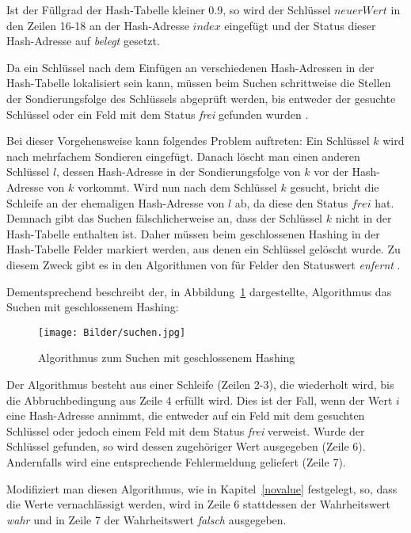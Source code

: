 Ist der Füllgrad der Hash-Tabelle kleiner \(0.9\), so wird der Schlüssel \(neuerWert\) in den Zeilen 16-18 an der Hash-Adresse \(index\) eingefügt und der Status dieser Hash-Adresse auf \textit{belegt} gesetzt.

Da ein Schlüssel nach dem Einfügen an verschiedenen Hash-Adressen in der Hash-Tabelle lokalisiert sein kann, müssen beim Suchen schrittweise die Stellen der Sondierungsfolge des Schlüssels abgeprüft werden, bis entweder der gesuchte Schlüssel oder ein Feld mit dem Status \textit{frei} gefunden wurden \cite[S.~204]{ADSOttWid}. 

Bei dieser Vorgehensweise kann folgendes Problem auftreten: Ein Schlüssel \(k\) wird nach mehrfachem Sondieren eingefügt. Danach löscht man einen anderen Schlüssel \(l\), dessen Hash-Adresse in der Sondierungsfolge von \(k\) vor der Hash-Adresse von \(k\) vorkommt. Wird nun nach dem Schlüssel \(k\) gesucht, bricht die Schleife an der ehemaligen Hash-Adresse von \(l\) ab, da diese den Status \(frei\) hat. Demnach gibt das Suchen fälschlicherweise an, dass der Schlüssel \(k\) nicht in der Hash-Tabelle enthalten ist. Daher müssen beim geschlossenen Hashing in der Hash-Tabelle Felder markiert werden, aus denen ein Schlüssel gelöscht wurde. Zu diesem Zweck gibt es in den Algorithmen von \cite{ADSWeiWei} für Felder den Statuswert \textit{enfernt} \cite[S.~242]{ADSWeiWei}. 

Dementsprechend beschreibt der, in Abbildung~\ref{ht_suchen} dargestellte, Algorithmus das Suchen mit geschlossenem Hashing:
\begin{figure}[H]
	\centering
	\texttt{[image: Bilder/suchen.jpg]}
	\caption{Algorithmus zum Suchen mit geschlossenem Hashing}
	\label{ht_suchen}
	\quelle \cite[S.~242]{ADSWeiWei}
\end{figure}
Der Algorithmus besteht aus einer Schleife (Zeilen 2-3), die wiederholt wird, bis die Abbruchbedingung aus Zeile 4 erfüllt wird. Dies ist der Fall, wenn der Wert \(i\) eine Hash-Adresse annimmt, die entweder auf ein Feld mit dem gesuchten Schlüssel oder jedoch einem Feld mit dem Status \textit{frei} verweist. Wurde der Schlüssel gefunden, so wird dessen zugehöriger Wert ausgegeben (Zeile 6). Andernfalls wird eine entsprechende Fehlermeldung geliefert (Zeile 7). 

Modifiziert man diesen Algorithmus, wie in Kapitel~\ref{novalue} festgelegt, so, dass die Werte vernachlässigt werden, wird in Zeile 6 stattdessen der Wahrheitswert \textit{wahr} und in Zeile 7 der Wahrheitswert \textit{falsch} ausgegeben.

